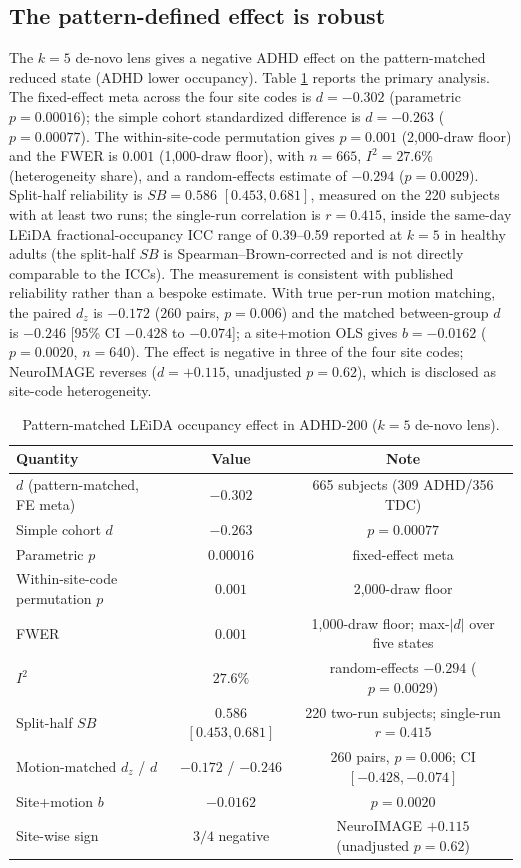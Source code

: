 \documentclass[11pt]{article}
\theoremstyle{definition}
\begin{document}
\subsection{The pattern-defined effect is robust}
The $k=5$ de-novo lens gives a negative ADHD effect on the pattern-matched reduced state
(ADHD lower occupancy). Table \ref{tab:o2} reports the primary analysis. The fixed-effect
meta across the four site codes is $d=-0.302$ (parametric $p=0.00016$); the simple cohort
standardized difference is $d=-0.263$ ($p=0.00077$). The within-site-code permutation
gives $p=0.001$ (2,000-draw floor) and the FWER is $0.001$ (1,000-draw floor), with
$n=665$, $I^2=27.6\%$ (heterogeneity share), and a random-effects estimate of $-0.294$ ($p=0.0029$).
Split-half reliability is $SB=0.586$ $[0.453,0.681]$, measured on the 220 subjects with
at least two runs; the single-run correlation is $r=0.415$, inside the same-day
LEiDA fractional-occupancy ICC range of 0.39--0.59 reported at $k=5$ in healthy adults\cite{Vohryzek2020}
(the split-half $SB$ is Spearman--Brown-corrected and is not directly comparable to the ICCs).
The measurement is consistent with published reliability rather than a bespoke estimate. With true per-run motion
matching, the paired $d_z$ is $-0.172$ ($260$ pairs, $p=0.006$) and the matched
between-group $d$ is $-0.246$ [95\% CI $-0.428$ to $-0.074$]; a site+motion OLS gives
$b=-0.0162$ ($p=0.0020$, $n=640$). The effect is negative in three of the four site
codes; NeuroIMAGE reverses ($d=+0.115$, unadjusted $p=0.62$), which is disclosed as
site-code heterogeneity.

\begin{table}[H]
\centering
\caption{Pattern-matched LEiDA occupancy effect in ADHD-200 ($k=5$ de-novo lens).}
\begin{tabular}{lcc}
\toprule
Quantity & Value & Note \\
\midrule
$d$ (pattern-matched, FE meta) & $-0.302$ & 665 subjects (309 ADHD/356 TDC) \\
Simple cohort $d$ & $-0.263$ & $p=0.00077$ \\
Parametric $p$ & $0.00016$ & fixed-effect meta \\
Within-site-code permutation $p$ & $0.001$ & 2,000-draw floor \\
FWER & $0.001$ & 1,000-draw floor; max-$|d|$ over five states \\
$I^2$ & $27.6\%$ & random-effects $-0.294$ ($p=0.0029$) \\
Split-half $SB$ & $0.586$ $[0.453,0.681]$ & 220 two-run subjects; single-run $r=0.415$ \\
Motion-matched $d_z$ / $d$ & $-0.172$ / $-0.246$ & 260 pairs, $p=0.006$; CI $[-0.428,-0.074]$ \\
Site+motion $b$ & $-0.0162$ & $p=0.0020$ \\
Site-wise sign & $3/4$ negative & NeuroIMAGE $+0.115$ (unadjusted $p=0.62$) \\
\bottomrule
\end{tabular}
\label{tab:o2}
\end{table}
\end{document}
